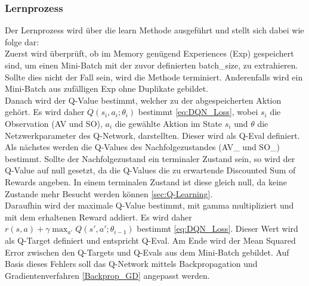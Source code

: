 \subsubsection{Lernprozess}
Der Lernprozess wird über die learn Methode ausgeführt und stellt sich dabei wie folge dar:\\
Zuerst wird überprüft, ob im Memory genügend Experiences (Exp) gespeichert sind, um einen Mini-Batch mit der zuvor definierten batch\_size, zu extrahieren. Sollte dies nicht der Fall sein, wird die Methode terminiert. Anderenfalls wird ein Mini-Batch aus zufälligen Exp ohne Duplikate gebildet.\\
Danach wird der Q-Value bestimmt, welcher zu der abgespeicherten Aktion gehört. Es wird daher $Q(s_i,a_i;\theta_i)$ bestimmt \ref{eq:DQN_Loss}, wobei $s_i$ die Observation (AV und SO), $a_i$ die gewählte Aktion im State $s_i$ und $\theta$ die Netzwerkparameter des Q-Network, darstellten. Dieser wird als Q-Eval definiert.
Als nächstes werden die Q-Values des Nachfolgezustandes (AV\_ und SO\_) bestimmt. Sollte der Nachfolgezustand ein terminaler Zustand sein, so wird der Q-Value auf null gesetzt, da die Q-Values die zu erwartende Discounted Sum of Rewards angeben. In einem terminalen Zustand ist diese gleich null, da keine Zustande mehr Besucht werden können \ref{sec:Q-Learning}.\\
Daraufhin wird der maximale Q-Value bestimmt, mit gamma multipliziert und mit dem erhaltenen Reward addiert. Es wird daher $r(s,a) + \gamma \max_{a'}Q(s',a';\theta_{i-1})$ bestimmt \ref{eq:DQN_Loss}. Dieser Wert wird als Q-Target definiert und entspricht Q-Eval.
Am Ende wird der Mean Squared Error zwischen den Q-Targets und Q-Evals aus dem Mini-Batch gebildet. Auf Basis dieses Fehlers soll das Q-Network mittels Backpropagation und Gradientenverfahren \ref{Backprop_GD} angepasst werden.

